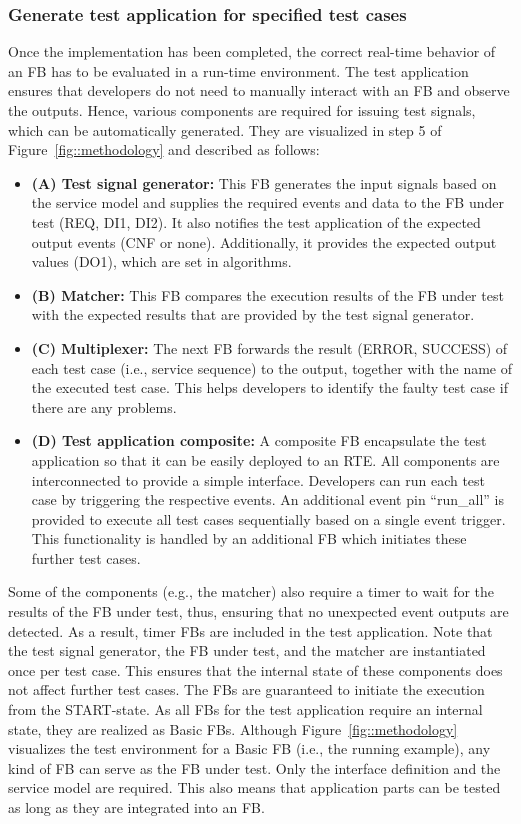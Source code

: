 \begin{bibunit}
\subsubsection{Generate test application for specified test cases}
Once the implementation has been completed, the correct real-time behavior of an FB has to be evaluated in a run-time environment. The test application ensures that developers do not need to manually interact with an FB and observe the outputs. Hence, various components are required for issuing test signals, which can be automatically generated. They are visualized in step 5 of Figure~\ref{fig::methodology} and described as follows:
\begin{itemize}
    \item \textbf{(A) Test signal generator:} This FB generates the input signals based on the service model and supplies the required events and data to the FB under test (REQ, DI1, DI2). It also notifies the test application of the expected output events (CNF or none). Additionally, it provides the expected output values (DO1), which are set in algorithms. 
    \item \textbf{(B) Matcher:} This FB compares the execution results of the FB under test with the expected results that are provided by the test signal generator. 
    \item \textbf{(C) Multiplexer: } The next FB forwards the result (ERROR, SUCCESS) of each test case (i.e., service sequence) to the output, together with the name of the executed test case. This helps developers to identify the faulty test case if there are any problems. 
    \item \textbf{(D) Test application composite: } A composite FB encapsulate the test application so that it can be easily deployed to an RTE. All components are interconnected to provide a simple interface. Developers can run each test case by triggering the respective events. An additional event pin ``run\_all'' is provided to execute all test cases sequentially based on a single event trigger. This functionality is handled by an additional FB which initiates these further test cases. 
\end{itemize}
Some of the components (e.g., the matcher) also require a timer to wait for the results of the FB under test, thus, ensuring that no unexpected event outputs are detected. As a result, timer FBs are included in the test application.
Note that the test signal generator, the FB under test, and the matcher are instantiated once per test case. This ensures that the internal state of these components does not affect further test cases. The FBs are guaranteed to initiate the execution from the START-state. As all FBs for the test application require an internal state, they are realized as Basic FBs. Although Figure~\ref{fig::methodology} visualizes the test environment for a Basic FB (i.e., the running example), any kind of FB can serve as the FB under test. Only the interface definition and the service model are required. This also means that application parts can be tested as long as they are integrated into an FB.


\end{bibunit}
